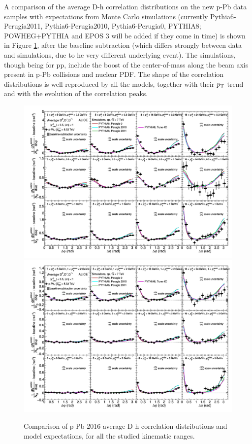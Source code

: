 A comparison of the average D-h correlation distributions on the new p-Pb data samples with expectations from Monte Carlo simulations (currently Pythia6-Perugia2011, Pythia6-Perugia2010, Pythia6-Perugia0, PYTHIA8; POWHEG+PYTHIA and EPOS 3 will be added if they come in time) is shown in Figure \ref{fig:CfrAverageModel}, after the baseline subtraction (which differs strongly between data and simulations, due to he very different underlying event). The simulations, though being for pp, include the boost of the center-of-mass along the beam axis present in p-Pb collisions and nuclear PDF. The shape of the correlation distributions is well reproduced by all the models, together with their $p_{\rm T}$ trend and with the evolution of the correlation peaks.

\begin{figure}[!htbp]
\centering
\landscape
{\includegraphics[width=\linewidth]{figures/CfrPPandModels/CorrelationppMC4x6_1New.png}}
{\includegraphics[width=\linewidth]{figures/CfrPPandModels/CorrelationppMC4x6_2New.png}}
\caption{Comparison of p-Pb 2016 average D-h correlation distributions and model expectations, for all the studied kinematic ranges.}
\label{fig:CfrAverageModel}
\end{figure}

